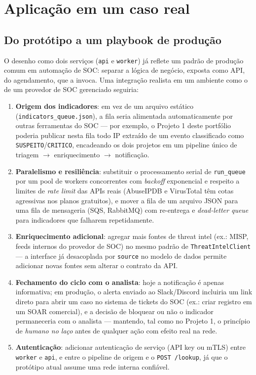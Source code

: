 \documentclass[11pt,a4paper]{article}
\begin{document}
\section{Aplicação em um caso real}
\label{sec:caso-real}

\subsection{Do protótipo a um playbook de produção}

O desenho como dois serviços (\texttt{api} e \texttt{worker}) já reflete um padrão de
produção comum em automação de SOC: separar a lógica de negócio, exposta como API, do
agendamento, que a invoca. Uma integração realista em um ambiente como o de um provedor
de SOC gerenciado seguiria:

\begin{enumerate}
  \item \textbf{Origem dos indicadores}: em vez de um arquivo estático
  (\texttt{indicators\_queue.json}), a fila seria alimentada automaticamente por
  outras ferramentas do SOC --- por exemplo, o Projeto 1 deste portfólio poderia
  publicar nesta fila todo IP extraído de um evento classificado como
  \texttt{SUSPEITO}/\texttt{CRITICO}, encadeando os dois projetos em um pipeline único
  de triagem $\rightarrow$ enriquecimento $\rightarrow$ notificação.
  \item \textbf{Paralelismo e resiliência}: substituir o processamento serial de
  \texttt{run\_queue} por um pool de workers concorrentes com \emph{backoff}
  exponencial e respeito a limites de \emph{rate limit} das APIs reais (AbuseIPDB e
  VirusTotal têm cotas agressivas nos planos gratuitos), e mover a fila de um arquivo
  JSON para uma fila de mensageria (SQS, RabbitMQ) com re-entrega e
  \emph{dead-letter queue} para indicadores que falharem repetidamente.
  \item \textbf{Enriquecimento adicional}: agregar mais fontes de threat intel (ex.:
  MISP, feeds internos do provedor de SOC) no mesmo padrão de
  \texttt{ThreatIntelClient} --- a interface já desacoplada por \texttt{source} no
  modelo de dados permite adicionar novas fontes sem alterar o contrato da API.
  \item \textbf{Fechamento do ciclo com o analista}: hoje a notificação é apenas
  informativa; em produção, o alerta enviado ao Slack/Discord incluiria um link direto
  para abrir um caso no sistema de tickets do SOC (ex.: criar registro em um SOAR
  comercial), e a decisão de bloquear ou não o indicador permaneceria com o analista
  --- mantendo, tal como no Projeto 1, o princípio de \emph{humano no laço} antes de
  qualquer ação com efeito real na rede.
  \item \textbf{Autenticação}: adicionar autenticação de serviço (API key ou mTLS)
  entre \texttt{worker} e \texttt{api}, e entre o pipeline de origem e o
  \texttt{POST /lookup}, já que o protótipo atual assume uma rede interna confiável.
\end{enumerate}
\end{document}
